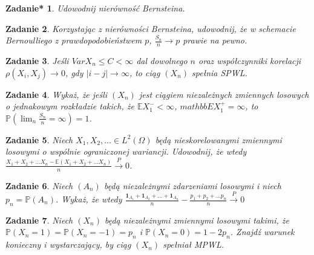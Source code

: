 \documentclass{mwart}
\newtheorem{zd}{Zadanie}
\newtheorem{zdt}[zd]{Zadanie*}
\begin{document}
\begin{zdt}
Udowodnij nierówność Bernsteina.
\end{zdt}

\begin{zd}
Korzystając z nierówności Bernsteina, udowodnij, że w schemacie Bernoulliego z prawdopodobieństwem $p$, $\frac{S_n}{n}\to p$ prawie na pewno.
\end{zd}

\begin{zd}
Jeśli $VarX_n \leq C < \infty$ dal dowolnego $n$ oraz współczynniki korelacji $\rho (X_i, X_j) \to 0$, gdy $|i-j|\to \infty$, to ciąg $(X_n)$ spełnia SPWL.
\end{zd}

\begin{zd}
Wykaż, że jeśli $(X_n)$ jest ciągiem niezależnych zmiennych losowych o jednakowym rozkładzie takich, że $\mathbb{E}X_1^- < \infty$, $mathbb{E}X_1^+ = \infty$, to $\mathbb{P}\left(\lim_n\frac{S_n}{n} = \infty\right) = 1$.
\end{zd}

\begin{zd}
Niech $X_1, X_2, \dots \in L^2\left(\Omega \right)$ będą nieskorelowanymi zmiennymi losowymi o wspólnie ograniczonej wariancji. Udowodnij, że wtedy $\frac{X_1+X_2 + \dots  X_n - \mathbb{E}\left(X_1+X_2 + \dots  X_n\right)}{n} \xrightarrow{P} 0$.
\end{zd}

\begin{zd}
Niech $(A_n)$ będą niezależnymi zdarzeniami losowymi i niech $p_n = \mathbb{P}(A_n)$. Wykaż, że wtedy $\frac{\pmb{1}_{A_1} + \pmb{1}_{A_2} + \dots + \pmb{1}_{A_n}}{n} - \frac{p_1 + p_2 + \dots p_n}{n} \xrightarrow{P} 0$
\end{zd}

\begin{zd}
Niech $(X_n)$ będą niezależnymi zmiennymi losowymi takimi, że $\mathbb{P}(X_n=1)=\mathbb{P}(X_n=-1) = p_n$ i $\mathbb{P}(X_n=0)=1-2p_n$. Znajdź warunek konieczny i wystarczający, by ciąg $(X_n)$ spełniał MPWL.
\end{zd}
\end{document}
